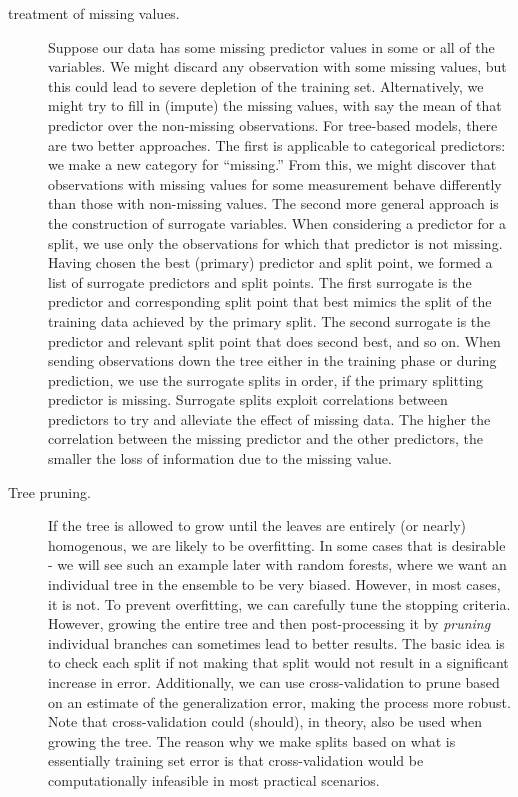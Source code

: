\begin{refsection}
\begin{description}
\item[treatment of missing values.] Suppose our data has some missing predictor values in some or all of the
variables. We might discard any observation with some missing values, but this could lead to severe depletion of the training set. Alternatively, we might try to fill in (impute) the missing values, with say the mean of that predictor over the non-missing observations. For tree-based models, there
are two better approaches. The first is applicable to categorical predictors: we make a new category for “missing.” From this, we might discover that observations with missing values for some measurement behave differently than those with non-missing values. The second more general approach is the construction of surrogate variables. When considering a predictor for a split, we use only the observations for which that predictor is not missing. Having chosen the best (primary) predictor and split point, we formed a list of surrogate predictors and split points. The first surrogate is the predictor and corresponding split point that best mimics the split of the training data achieved by the primary split. The second surrogate is the predictor and relevant split point that does second best, and so on. When sending observations down the tree either in the training phase or during prediction, we use the surrogate splits in order, if the primary splitting predictor is missing. Surrogate splits exploit correlations between predictors to try and alleviate the effect of missing data. The higher the correlation between the missing predictor and the other predictors, the smaller the loss of information due to the missing value.

\item[Tree pruning.] If the tree is allowed to grow until the leaves are entirely (or nearly) homogenous, we are likely to be overfitting. In some cases that is desirable - we will see such an example later with random forests, where we want an individual tree in the ensemble to be very biased. However, in most cases, it is not. To prevent overfitting, we can carefully tune the stopping criteria. However, growing the entire tree and then post-processing it by {\em pruning} individual branches can sometimes lead to better results. The basic idea is to check each split if not making that split would not result in a significant increase in error.
Additionally, we can use cross-validation to prune based on an estimate of the generalization error, making the process more robust. Note that cross-validation could (should), in theory, also be used when growing the tree. The reason why we make splits based on what is essentially training set error is that cross-validation would be computationally infeasible in most practical scenarios. 


\end{description}
\end{refsection}
